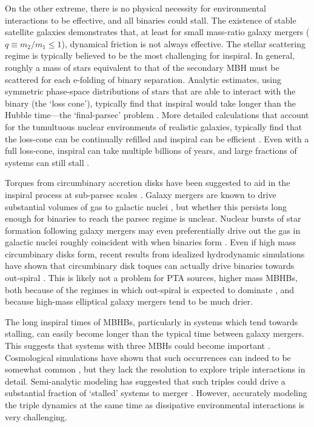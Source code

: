\documentclass[useAMS, usenatbib]{mnras}
\begin{document}
    On the other extreme, there is no physical necessity for environmental interactions to be effective, and all binaries could stall.  The existence of stable satellite galaxies demonstrates that, at least for small mass-ratio galaxy mergers ($q \equiv m_2/m_1 \leq 1$), dynamical friction is not always effective.  The stellar scattering regime is typically believed to be the most challenging for inspiral.  In general, roughly a mass of stars equivalent to that of the secondary MBH must be scattered for each e-folding of binary separation.  Analytic estimates, using symmetric phase-space distributions of stars that are able to interact with the binary (the `loss cone'), typically find that inspiral would take longer than the Hubble time---the `final-parsec' problem .  More detailed calculations that account for the tumultuous nuclear environments of realistic galaxies, typically find that the loss-cone can be continually refilled and inspiral can be efficient \needcite{}.  Even with a full loss-cone, inspiral can take multiple billions of years, and large fractions of systems can still stall .

    Torques from circumbinary accretion disks have been suggested to aid in the inspiral process at sub-parsec scales .  Galaxy mergers are known to drive substantial volumes of gas to galactic nuclei , but whether this persists long enough for binaries to reach the parsec regime is unclear.  Nuclear bursts of star formation following galaxy mergers may even preferentially drive out the gas in galactic nuclei roughly coincident with when binaries form .  Even if high mass circumbinary disks form, recent results from idealized hydrodynamic simulations have shown that circumbinary disk toques can actually drive binaries towards out-spiral .  This is likely not a problem for PTA sources, higher mass MBHBs, both because of the regimes in which out-spiral is expected to dominate , and because high-mass elliptical galaxy mergers tend to be much drier.

    The long inspiral times of MBHBs, particularly in systems which tend towards stalling, can easily become longer than the typical time between galaxy mergers.  This suggests that systems with three MBHs could become important .  Cosmological simulations have shown that such occurrences can indeed to be somewhat common , but they lack the resolution to explore triple interactions in detail.  Semi-analytic modeling has suggested that such triples could drive a substantial fraction of `stalled' systems to merger .  However, accurately modeling the triple dynamics at the same time as dissipative environmental interactions is very challenging.
\end{document}
